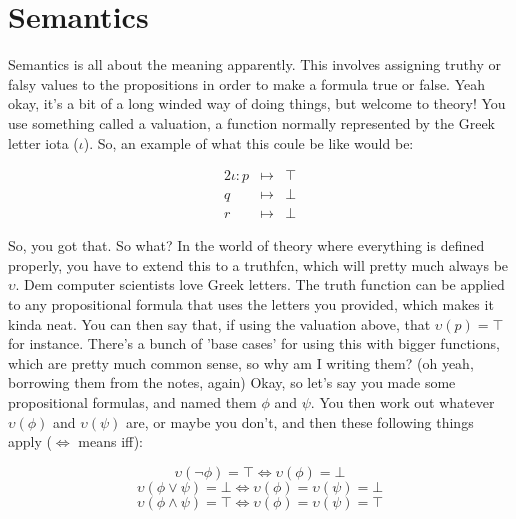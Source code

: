 \section{Semantics}
Semantics is all about the meaning apparently. This involves assigning truthy or falsy values to the propositions in order to make a formula true or false. Yeah okay, it's a bit of a long winded way of doing things, but welcome to theory! You use something called a \gls{valuation}, a function normally represented by the Greek letter iota ($\iota$). So, an example of what this coule be like would be:

\begin{alignat*}{2}
    \iota:p&\longmapsto&\top\\
    q&\longmapsto&\bot\\
    r&\longmapsto&\bot
\end{alignat*}

So, you got that. So what? In the world of theory where everything is defined properly, you have to extend this to a \gls{truthfcn}, which will pretty much always be $\upsilon$. Dem computer scientists love Greek letters. The truth function can be applied to any propositional formula that uses the letters you provided, which makes it kinda neat. You can then say that, if using the valuation above, that $\upsilon(p) = \top$ for instance. There's a bunch of 'base cases' for using this with bigger functions, which are pretty much common sense, so why am I writing them? (oh yeah, borrowing them from the notes, again) Okay, so let's say you made some propositional formulas, and named them $\phi$ and $\psi$. You then work out whatever $\upsilon(\phi)$ and $\upsilon(\psi)$ are, or maybe you don't, and then these following things apply ($\iff$ means iff):

$$\upsilon(\neg\phi) = \top \iff \upsilon(\phi) = \bot$$
$$\upsilon(\phi \lor \psi) = \bot \iff \upsilon(\phi) = \upsilon(\psi) = \bot$$
$$\upsilon(\phi \land \psi) = \top \iff \upsilon(\phi) = \upsilon(\psi) = \top$$
